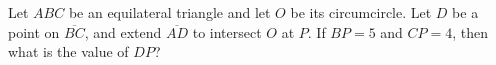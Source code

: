 Let $ABC$ be an equilateral triangle and let $O$ be its circumcircle. Let $D$ be a point on $\overline{BC}$, and extend $\overline{AD}$ to intersect $O$ at $P$. If $BP = 5$ and $CP = 4$, then what is the value of $DP$?

